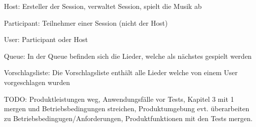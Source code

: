 \documentclass[oneside, ngerman]{sdqtechreport}
\begin{document}
Host: Ersteller der Session, verwaltet Session, spielt die Musik ab

Participant: Teilnehmer einer Session (nicht der Host)

User: Participant oder Host

Queue: In der Queue befinden sich die Lieder, welche als nächstes gespielt werden

Vorschlagsliste: Die Vorschlagsliste enthält alle Lieder welche von einem User vorgeschlagen wurden


TODO: Produktleistungen weg, Anwendungsfälle vor Tests, Kapitel 3 mit 1 mergen und Betriebsbedingungen streichen, Produktumgebung evt. überarbeiten zu Betriebsbedingugen/Anforderungen, Produktfunktionen mit den Tests mergen.
\section{}
\end{document}
